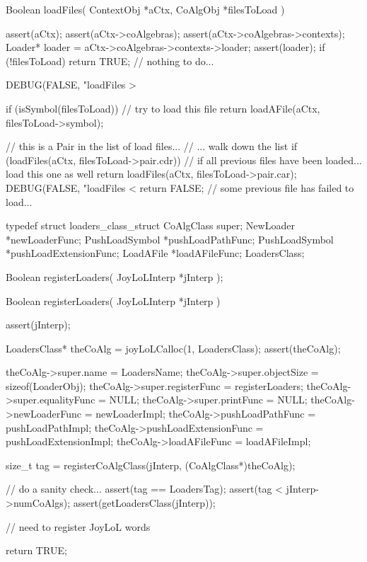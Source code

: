\starttyping
Boolean loadFiles(
  ContextObj *aCtx,
  CoAlgObj   *filesToLoad
) {
  assert(aCtx);
  assert(aCtx->coAlgebras);
  assert(aCtx->coAlgebras->contexts);
  Loader* loader = aCtx->coAlgebras->contexts->loader;
  assert(loader);
  if (!filesToLoad) return TRUE; // nothing to do...

  DEBUG(FALSE, "loadFiles > %

  if (isSymbol(filesToLoad)) { // try to load this file
    return loadAFile(aCtx, filesToLoad->symbol);
  }

  // this is a Pair in the list of load files...
  // ... walk down the list
  if (loadFiles(aCtx, filesToLoad->pair.cdr)) {
    // if all previous files have been loaded... load this one as well
    return loadFiles(aCtx, filesToLoad->pair.car);
  }
  DEBUG(FALSE, "loadFiles < %
  return FALSE; // some previous file has failed to load...
}
\stoptyping

\startTestSuite[regiserLoaders]

\startCHeader
typedef struct loaders_class_struct {
  CoAlgClass      super;
  NewLoader      *newLoaderFunc;
  PushLoadSymbol *pushLoadPathFunc;
  PushLoadSymbol *pushLoadExtensionFunc;
  LoadAFile      *loadAFileFunc;
} LoadersClass;
\stopCHeader

\startCHeader
Boolean registerLoaders(
  JoyLoLInterp *jInterp
);
\stopCHeader
{}

\startCCode
Boolean registerLoaders(
  JoyLoLInterp *jInterp
) {
  assert(jInterp);
  
  LoadersClass* theCoAlg =
    joyLoLCalloc(1, LoadersClass);
  assert(theCoAlg);
  
  theCoAlg->super.name            = LoadersName;
  theCoAlg->super.objectSize      = sizeof(LoaderObj);
  theCoAlg->super.registerFunc    = registerLoaders;
  theCoAlg->super.equalityFunc    = NULL;
  theCoAlg->super.printFunc       = NULL;
  theCoAlg->newLoaderFunc         = newLoaderImpl;
  theCoAlg->pushLoadPathFunc      = pushLoadPathImpl;
  theCoAlg->pushLoadExtensionFunc = pushLoadExtensionImpl;
  theCoAlg->loadAFileFunc         = loadAFileImpl;

  size_t tag =
    registerCoAlgClass(jInterp, (CoAlgClass*)theCoAlg);
  
  // do a sanity check...
  assert(tag == LoadersTag);
  assert(tag < jInterp->numCoAlgs);
  assert(getLoadersClass(jInterp));
    
  // need to register JoyLoL words
  
  return TRUE;
}
\stopCCode

